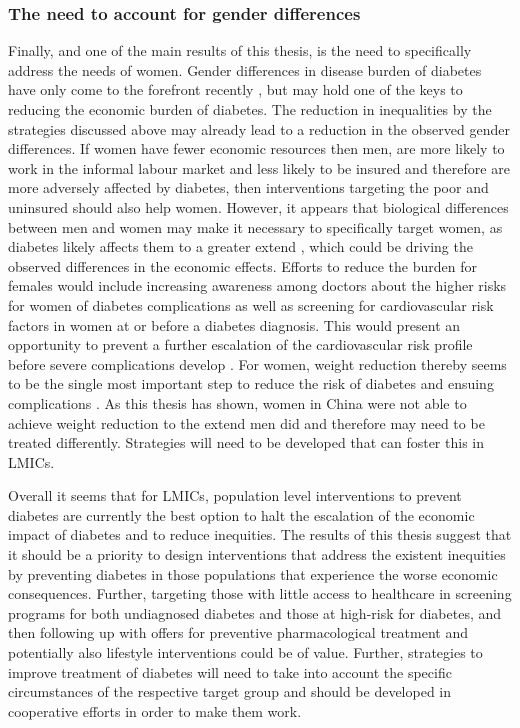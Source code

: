\subsubsection{The need to account for gender differences}
Finally, and one of the main results of this thesis, is the need to specifically address the needs of women. Gender differences in disease burden of diabetes have only come to the forefront recently \parencite{Peters2015}, but may hold one of the keys to reducing the economic burden of diabetes. The reduction in inequalities by the strategies discussed above may already lead to a reduction in the observed gender differences. If women have fewer economic resources then men, are more likely to work in the informal labour market and less likely to be insured \parencite{Galli2008} and therefore are more adversely affected by diabetes, then interventions targeting the poor and uninsured should also help women. However, it appears that biological differences between men and women may make it necessary to specifically target women, as diabetes likely affects them to a greater extend \parencite{Peters2015,Peters2014a,Peters2014,Bertram2010}, which could be driving the observed differences in the economic effects. Efforts to reduce the burden for females would include increasing awareness among doctors about the higher risks for women of diabetes complications as well as screening for cardiovascular risk factors in women at or before a diabetes diagnosis. This would present an opportunity to prevent a further escalation of the cardiovascular risk profile before severe complications develop \parencite{Peters2015}. For women, weight reduction thereby seems to be the single most important step to reduce the risk of diabetes and ensuing complications \parencite{Peters2015}. As this thesis has shown, women in China were not able to achieve weight reduction to the extend men did and therefore may need to be treated differently. Strategies will need to be developed that can foster this in \acp{LMIC}. 

Overall it seems that for \acp{LMIC}, population level interventions to prevent diabetes are currently the best option to halt the escalation of the economic impact of diabetes and to reduce inequities. The results of this thesis suggest that it should be a priority to design interventions that address the existent inequities by preventing diabetes in those populations that experience the worse economic consequences. Further, targeting those with little access to healthcare in screening programs for both undiagnosed diabetes and those at high-risk for diabetes, and then following up with offers for preventive pharmacological treatment and potentially also lifestyle interventions could be of value. Further, strategies to improve treatment of diabetes will need to take into account the specific circumstances of the respective target group and should be developed in cooperative efforts in order to make them work.



